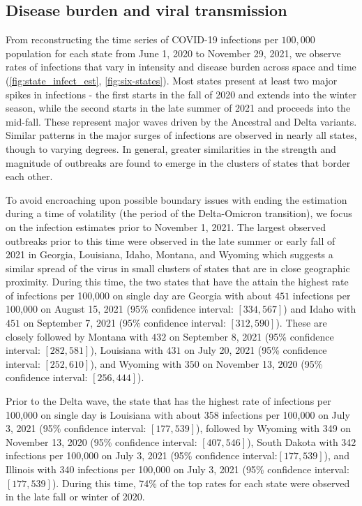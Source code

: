 \subsection{Disease burden and viral transmission}


From reconstructing the time series of COVID-19 infections per $100,000$
population for each \US state from June 1, 2020 to November 29, 2021, we
observe rates of infections that vary in intensity and disease burden across
space and time (\autoref{fig:state_infect_est}, \autoref{fig:six-states}).  
Most states present at least two major spikes in infections - the first starts
in the fall of 2020 and extends into the winter season, while the second starts
in the late summer of 2021 and proceeds into the mid-fall. These represent major
waves driven by the Ancestral and Delta variants. Similar patterns in the major
surges of infections are observed in nearly all states, though to varying
degrees. In general, greater similarities in the strength and magnitude of
outbreaks are found to emerge in the clusters of states that border each other.

To avoid encroaching upon possible boundary issues with ending the estimation
during a time of volatility (the period of the Delta-Omicron transition), we
focus on the infection estimates prior to November 1, 2021. The largest observed
outbreaks prior to this time were observed in the late summer or early fall of
2021 in Georgia, Louisiana, Idaho, Montana, and Wyoming which suggests a similar
spread of the virus in small clusters of states that are in close geographic
proximity. During this time, the two states that have the attain the highest
rate of infections per 100,000 on single day are Georgia with about $451$
infections per 100,000 on August 15, 2021 (95\% confidence interval: $[334,
567]$) and Idaho with $451$ on September 7, 2021 (95\% confidence interval:
$[312, 590]$). These are closely followed by Montana with $432$ on September 8,
2021 (95\% confidence interval: $[282, 581]$), Louisiana with $431$ on July 20,
2021 (95\% confidence interval: $[252, 610]$), and Wyoming with $350$ on
November 13, 2020 (95\% confidence interval: $[256, 444]$).

Prior to the Delta wave, the state that has the highest rate of infections per
100,000 on single day is Louisiana with about 358 infections per 100,000 on July
3, 2021 (95\% confidence interval: $[177, 539]$), followed by Wyoming with 349
on November 13, 2020 (95\% confidence interval: $[407, 546]$), South Dakota with
342 infections per 100,000 on July 3, 2021 (95\% confidence interval:$[177,
539]$), and Illinois with 340 infections per 100,000 on July 3, 2021 (95\%
confidence interval: $[177, 539]$). During this time, 74\% of the top rates for
each state were observed in the late fall or winter of 2020.

